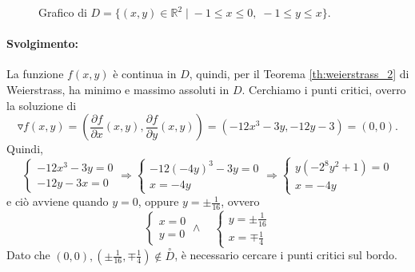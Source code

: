 \begin{example}
\begin{figure}[ht]
		\caption{Grafico di $D=\{(x,y)\in\mathbb{R}^2\;|\; -1\leq x\leq 0,\; -1\leq y\leq x\}$.}\label{fig:vincolo}
	\end{figure}
	
	\paragraph{Svolgimento:} La funzione $f(x,y)$ è continua in $D$, quindi, per il Teorema \ref{th:weierstrass_2} di Weierstrass, ha minimo e massimo assoluti in $D$.
	Cerchiamo i punti critici, overro la soluzione di
	\begin{equation*}
		\triangledown f(x,y) = \left(\frac{\partial f}{\partial x}(x,y),\frac{\partial f}{\partial y}(x,y)\right) = (-12x^3 - 3y, -12y-3)=(0,0).
	\end{equation*}
	Quindi,
	\begin{equation*}
		\begin{cases}
			-12x^3-3y=0\\
			-12 y - 3x = 0
		\end{cases}\Rightarrow
		\begin{cases}
			-12(-4y)^3 - 3y=0\\
			x=-4y
		\end{cases}
		\Rightarrow
		\begin{cases}
			y(-2^8y^2 + 1)=0\\
			x=-4y
		\end{cases}
	\end{equation*}
	e ciò avviene quando $y=0$, oppure $y=\pm\frac{1}{16}$, ovvero
	\begin{equation*}
		\begin{cases}
			x=0\\
			y=0
		\end{cases}\land\quad
		\begin{cases}
			y=\pm\frac{1}{16}\\
			x=\mp \frac{1}{4}
		\end{cases}
	\end{equation*}
	Dato che $(0,0), (\pm\frac{1}{16},\mp \frac{1}{4})\notin \overset{\circ}{D}$, è necessario cercare i punti critici sul bordo.\\

\end{example}
